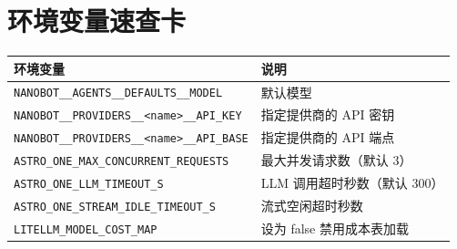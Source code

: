\documentclass[12pt,a4paper,UTF8]{ctexart}
\begin{document}
\chapter{环境变量速查卡}

\begin{longtable}{L{6.5cm} L{8.5cm}}
\toprule
\textbf{环境变量} & \textbf{说明} \\
\midrule
\texttt{NANOBOT\_\_AGENTS\_\_DEFAULTS\_\_MODEL} & 默认模型 \\
\texttt{NANOBOT\_\_PROVIDERS\_\_<name>\_\_API\_KEY} & 指定提供商的 API 密钥 \\
\texttt{NANOBOT\_\_PROVIDERS\_\_<name>\_\_API\_BASE} & 指定提供商的 API 端点 \\
\texttt{ASTRO\_ONE\_MAX\_CONCURRENT\_REQUESTS} & 最大并发请求数（默认 3） \\
\texttt{ASTRO\_ONE\_LLM\_TIMEOUT\_S} & LLM 调用超时秒数（默认 300） \\
\texttt{ASTRO\_ONE\_STREAM\_IDLE\_TIMEOUT\_S} & 流式空闲超时秒数 \\
\texttt{LITELLM\_MODEL\_COST\_MAP} & 设为 false 禁用成本表加载 \\
\bottomrule
\end{longtable}
\end{document}
